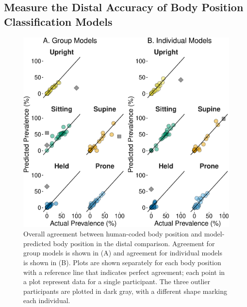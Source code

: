 \documentclass[
  man]{apa6}
\begin{document}
\hypertarget{measure-the-distal-accuracy-of-body-position-classification-models}{%
\subsection{Measure the Distal Accuracy of Body Position Classification Models}\label{measure-the-distal-accuracy-of-body-position-classification-models}}

\begin{figure}

{\centering \includegraphics{manuscript_files/figure-latex/part2overall-1} 

}

\caption{Overall agreement between human-coded body position and model-predicted body position in the distal comparison. Agreement for group models is shown in (A) and agreement for individual models is shown in (B). Plots are shown separately for each body position with a reference line that indicates perfect agreement; each point in a plot represent data for a single participant. The three outlier participants are plotted in dark gray, with a different shape marking each individual.}\label{fig:part2overall}
\end{figure}
\end{document}
